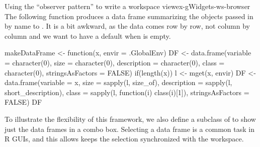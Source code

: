 \begin{example}{Using the ``observer pattern'' to write a workspace view}{ex-gWidgets-ws-browser}
The following function produces a data frame summarizing the objects passed in
by name to . It is a bit awkward, as the data comes row by
row, not column by column and we want to have a default when 
is empty.
\begin{Schunk}
\begin{Sinput}
 makeDataFrame <- function(x, envir = .GlobalEnv) {
   DF <- data.frame(variable = character(0),
                    size = character(0), 
                    description = character(0), 
                    class = character(0),
                    stringsAsFactors = FALSE)
   if(length(x)) {
     l <- mget(x, envir)
     DF <- data.frame(variable = x,
                     size = sapply(l, size_of),
                     description = sapply(l, short_description),
                     class  =  sapply(l, function(i) class(i)[1]),
                     stringsAsFactors = FALSE)
   }
   DF
 }
\end{Sinput}
\end{Schunk}
To illustrate the flexibility of this framework, we also define a
subclass of  to show just the data frames in a combo
box. Selecting a data frame is a common task in R GUIs, and this
allows keeps the selection synchronized with the workspace.

\begin{Schunk}
\end{Schunk}
%


\end{example}
